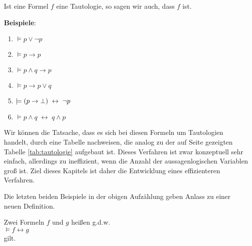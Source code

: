 \noindent
Ist eine Formel $f$ eine Tautologie, so sagen wir auch, dass $f$
 ist.

\noindent
\textbf{Beispiele}:
\begin{enumerate}
\item $\models p \vee \neg p$
\item $\models p \rightarrow p$
\item $\models p \wedge q \rightarrow p$
\item $\models p \rightarrow p \vee q$
\item $\models (p \rightarrow \bot) \;\leftrightarrow\; \neg p$
\item $\models p \wedge q \;\leftrightarrow\; q \wedge p$
\end{enumerate}
Wir können die Tatsache, dass es sich bei diesen Formeln um Tautologien handelt, durch
eine Tabelle nachweisen, die analog zu der auf Seite \pageref{tab:tautologie} gezeigten
Tabelle \ref{tab:tautologie} aufgebaut ist.  Dieses Verfahren ist zwar konzeptuell sehr
einfach, allerdings zu ineffizient, wenn die Anzahl der aussagenlogischen Variablen groß
ist.  Ziel dieses Kapitels ist daher die Entwicklung eines effizienteren Verfahren.

Die letzten beiden Beispiele in der obigen Aufzählung geben Anlass zu einer neuen Definition.
\begin{Definition}[Äquivalent]
  Zwei Formeln $f$ und $g$ heißen  g.d.w.  \\[0.2cm]
  \hspace*{1.3cm} $\models f \leftrightarrow g$ 
  \\[0.1cm]
  gilt.
  \eox
\end{Definition}

